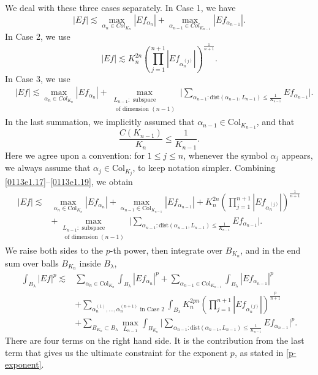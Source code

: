 \documentclass[12pt,leqno]{amsart}
\def\beq{\begin{equation}}
\def\endeq{\end{equation}}
\def\lesim{\lesssim}
\theoremstyle{plain}
\numberwithin{equation}{section}
\begin{document}
We deal with these three cases separately. In Case 1, we have 
\beq\label{0113e1.17}
|Ef|\lesim \max_{\alpha_n\in Col_{K_n}} |Ef_{\alpha_n}|+\max_{\alpha_{n-1}\in Col_{K_{n-1}}} |Ef_{\alpha_{n-1}}|.
\endeq
In Case 2, we use
\[
|Ef|\lesim K_n^{2n} \left( \prod_{j=1}^{n+1} |Ef_{\alpha_n^{(j)}}|\right)^{\frac{1}{n+1}}.
\]
In Case 3, we use 
\beq\label{0113e1.19}
\begin{split}
& |Ef|\lesim  \max_{\alpha_n\in Col_{K_n}} |Ef_{\alpha_n}| + \max_{\substack{L_{n-1}: \text{ subspace}\\ \text{ of dimension } (n-1)}} \Big|\sum_{\alpha_{n-1}: \text{dist}(\alpha_{n-1}, L_{n-1})\le \frac{1}{K_{n-1}}}Ef_{\alpha_{n-1}}\Big|.
\end{split}
\endeq
In the last summation, we implicitly assumed that $\alpha_{n-1}\in \mathrm{Col}_{K_{n-1}}$, and that 
\[
\frac{C(K_{n-1})}{K_n}\le \frac{1}{K_{n-1}}.
\] Here we agree upon a convention: for $1\le j\le n$, whenever the symbol $\alpha_j$ appears, we always assume that $\alpha_j\in \mathrm{Col}_{K_j}$, to keep notation simpler. Combining \eqref{0113e1.17}--\eqref{0113e1.19}, we obtain
\[
\begin{split}
|Ef|\lesim & \max_{\alpha_n\in \mathrm{Col}_{K_n}} |Ef_{\alpha_n}|+\max_{\alpha_{n-1}\in \mathrm{Col}_{K_{n-1}}} |Ef_{\alpha_{n-1}}| + K_n^{2n} \left( \prod_{j=1}^{n+1} |Ef_{\alpha_n^{(j)}}|\right)^{\frac{1}{n+1}}\\
& + \max_{\substack{L_{n-1}: \text{ subspace}\\ \text{ of dimension } (n-1)}} \Big|\sum_{\alpha_{n-1}: \text{dist}(\alpha_{n-1}, L_{n-1})\le \frac{1}{K_{n-1}}}Ef_{\alpha_{n-1}}\Big|.
\end{split}
\]
We raise both sides to the $p$-th power, then integrate over $B_{K_n}$, and in the end 
sum over balls $B_{K_n}$ inside $B_{\lambda}$,
\beq\label{different-case}
\begin{split}
\int_{B_{\lambda}}|Ef|^p\lesim & \sum_{\alpha_n\in \mathrm{Col}_{K_n}} \int_{B_{\lambda}}|Ef_{\alpha_n}|^p+\sum_{\alpha_{n-1}\in \mathrm{Col}_{K_{n-1}}} \int_{B_{\lambda}}|Ef_{\alpha_{n-1}}|^p\\
& + \sum_{\alpha_n^{(1)}, \dots, \alpha_n^{(n+1)} \text{ in Case 2} }\int_{B_{\lambda}} K_n^{2pn} \left( \prod_{j=1}^{n+1} |Ef_{\alpha_n^{(j)}}|\right)^{\frac{p}{n+1}}\\
& + \sum_{B_{K_n}\subset B_{\lambda}}\max_{L_{n-1}} \int_{B_{K_n}}\Big|\sum_{\alpha_{n-1}: \text{dist}(\alpha_{n-1}, L_{n-1})\le \frac{1}{K_{n-1}}}Ef_{\alpha_{n-1}}\Big|^p.
\end{split}
\endeq
There are four terms on the right hand side. It is the contribution from the last term that gives us the ultimate constraint for the exponent $p$, as stated in \eqref{p-exponent}. \\
\end{document}
